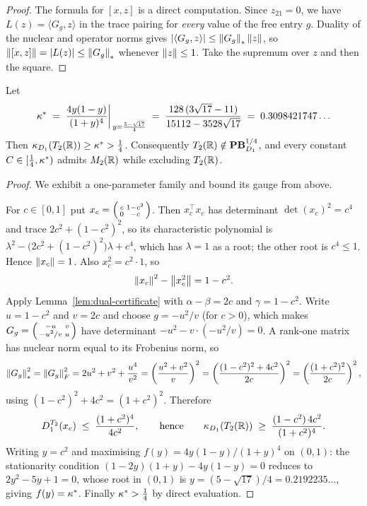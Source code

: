 \begin{proof}
The formula for $[x,z]$ is a direct computation.  Since $z_{21}=0$, we have
$L(z)=\langle G_g,z\rangle$ in the trace pairing for \emph{every} value of the
free entry $g$.  Duality of the nuclear and operator norms gives
$\left\lvert\langle G_g,z\rangle\right\rvert\le\left\lVert G_g\right\rVert_*\left\lVert z\right\rVert$, so
$\left\lVert[x,z]\right\rVert=\left\lvert L(z)\right\rvert\le\left\lVert G_g\right\rVert_*$ whenever $\left\lVert z\right\rVert\le1$.  Take the
supremum over $z$ and then the square.
\end{proof}

\begin{proposition}[$T_2(\RR)$ is not an object at $C=\tfrac14$]
\label{prop:T2-constant}
Let
\[
  \kappa^*\;=\;\frac{4y(1-y)}{(1+y)^4}\bigg|_{\,y=\frac{5-\sqrt{17}}{4}}
  \;=\;\frac{128\,(3\sqrt{17}-11)}{15112-3528\sqrt{17}}
  \;=\;0.3098421747\ldots
\]
Then $\kappa_{D_1}(T_2(\mathbb{R}))\ge\kappa^*>\tfrac14$.  Consequently
$T_2(\mathbb{R})\notin\mathbf{PB}^{1/4}_{D_1}$, and every constant
$C\in[\tfrac14,\kappa^*)$ admits $M_2(\mathbb{R})$ while excluding $T_2(\RR)$.
\end{proposition}

\begin{proof}
We exhibit a one-parameter family and bound its gauge from above.

For $c\in[0,1]$ put
$x_c=\begin{psmallmatrix}c&1-c^2\\0&-c\end{psmallmatrix}$.  Then
$x_c^\top x_c$ has determinant $\det(x_c)^2=c^4$ and trace $2c^2+(1-c^2)^2$, so
its characteristic polynomial is $\lambda^2-\bigl(2c^2+(1-c^2)^2\bigr)\lambda+c^4$,
which has $\lambda=1$ as a root; the other root is $c^4\le1$.  Hence
$\left\lVert x_c\right\rVert=1$.  Also $x_c^2=c^2\cdot1$, so
\[
  \left\lVert x_c\right\rVert^2-\left\lVert x_c^2\right\rVert=1-c^2 .
\]
Apply Lemma~\ref{lem:dual-certificate} with $\alpha-\beta=2c$ and
$\gamma=1-c^2$.  Write $u=1-c^2$ and $v=2c$ and choose $g=-u^2/v$ (for $c>0$),
which makes
$G_g=\begin{psmallmatrix}-u&v\\-u^2/v&u\end{psmallmatrix}$ have determinant
$-u^2-v\cdot(-u^2/v)=0$.  A rank-one matrix has nuclear norm equal to its
Frobenius norm, so
\[
  \left\lVert G_g\right\rVert_*^2=\left\lVert G_g\right\rVert_F^2=2u^2+v^2+\frac{u^4}{v^2}
  =\left(\frac{u^2+v^2}{v}\right)^{2}
  =\left(\frac{(1-c^2)^2+4c^2}{2c}\right)^{2}
  =\left(\frac{(1+c^2)^2}{2c}\right)^{2},
\]
using $(1-c^2)^2+4c^2=(1+c^2)^2$.  Therefore
\[
  D_1^{T_2}(x_c)\;\le\;\frac{(1+c^2)^4}{4c^2},
  \qquad\text{hence}\qquad
  \kappa_{D_1}(T_2(\mathbb{R}))\;\ge\;\frac{(1-c^2)\,4c^2}{(1+c^2)^4} .
\]
Writing $y=c^2$ and maximising $f(y)=4y(1-y)/(1+y)^4$ on $(0,1)$: the
stationarity condition $(1-2y)(1+y)-4y(1-y)=0$ reduces to $2y^2-5y+1=0$, whose
root in $(0,1)$ is $y=(5-\sqrt{17})/4=0.2192235\ldots$, giving
$f(y)=\kappa^*$.  Finally $\kappa^*>\tfrac14$ by direct evaluation.
\end{proof}

